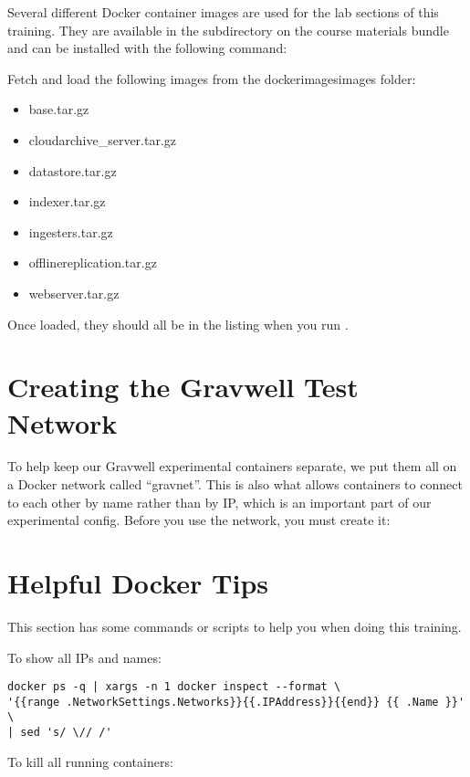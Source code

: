 Several different Docker container images are used for the lab sections
of this training. They are available in the  subdirectory on
the course materials bundle and can be installed with the following
command:


Fetch and load the following images from the dockerimagesimages folder:

\begin{itemize}
	\item base.tar.gz
	\item cloudarchive\_server.tar.gz
	\item datastore.tar.gz
	\item indexer.tar.gz
	\item ingesters.tar.gz
	\item offlinereplication.tar.gz
	\item webserver.tar.gz
\end{itemize}

Once loaded, they should all be in the listing when you run .

\section{Creating the Gravwell Test Network}

To help keep our Gravwell experimental containers separate, we put them
all on a Docker network called ``gravnet''. This is also what allows
containers to connect to each other by name rather than by IP, which is
an important part of our experimental config. Before you use the
network, you must create it:



\section{Helpful Docker Tips}

This section has some commands or scripts to help you when doing this
training.

To show all IPs and names:

\begin{Verbatim}[breaklines=true]
docker ps -q | xargs -n 1 docker inspect --format \
'{{range .NetworkSettings.Networks}}{{.IPAddress}}{{end}} {{ .Name }}' \
| sed 's/ \// /'
\end{Verbatim}

To kill all running containers:


